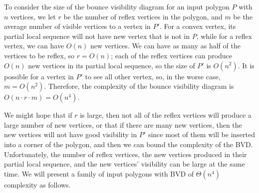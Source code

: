 \documentclass[letterpaper, 10 pt, conference]{ieeeconf}  %
\begin{document}
To consider the size of the bounce visibility diagram for an input polygon $P$ with $n$ vertices, we let $r$ be the number of reflex vertices in the polygon, and $m$ be the average number of visible vertices to a vertex in $P'$. For a convex vertex, its partial local sequence will not have new vertex that is not in $P$, while for a reflex vertex, we can have $O(n)$ new vertices. We can have as many as half of the vertices to be reflex, so $r = O(n)$; each of the reflex vertices can produce $O(n)$ new vertices in its partial local sequence, so the size of $P'$ is $O(n^2)$. It is possible for a vertex in $P'$ to see all other vertex, so, in the worse case, $m = O(n^2)$. Therefore, the complexity of the bounce visibility diagram is $O(n\cdot r\cdot m) = O(n^4)$. 

We might hope that if $r$ is large, then not all of the reflex vertices will produce a large number of new vertices, or that if there are many new vertices, then the new vertices will not have good visibility in $P'$ since most of them will be inserted into a corner of the polygon, and then we can bound the complexity of the BVD. Unfortunately, the number of reflex vertices, the new vertices produced in their partial local sequence, and the new vertices' visibility can be large at the same time. We will present a family of input polygons with BVD of $\Theta(n^4)$ complexity as follows. 
\end{document}
